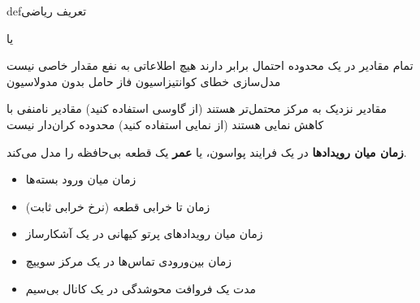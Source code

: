 \begin{PSbox}[unbreakable]{def}{تعریف ریاضی}

 یا 

\end{PSbox}










\lr{\mbox{\PSyes{}}} تمام مقادیر در یک محدوده احتمال برابر دارند\PSbr{}\lr{\mbox{\PSyes{}}} هیچ اطلاعاتی به نفع مقدار خاصی نیست\PSbr{}\lr{\mbox{\PSyes{}}} مدل‌سازی خطای کوانتیزاسیون\PSbr{}\lr{\mbox{\PSyes{}}} فاز حامل بدون مدولاسیون


\lr{\mbox{\PSno{}}} مقادیر نزدیک به مرکز محتمل‌تر هستند (از گاوسی استفاده کنید)\PSbr{}\lr{\mbox{\PSno{}}} مقادیر نامنفی با کاهش نمایی هستند (از نمایی استفاده کنید)\PSbr{}\lr{\mbox{\PSno{}}} محدوده کران‌دار نیست



\textbf{زمان میان رویدادها} در یک فرایند پواسون، یا \textbf{عمر} یک قطعه بی‌حافظه را مدل می‌کند.


\begin{itemize}
\tightlist
\item
  زمان میان ورود بسته‌ها
\item
  زمان تا خرابی قطعه (نرخ خرابی ثابت)
\item
  زمان میان رویدادهای پرتو کیهانی در یک آشکارساز
\item
  زمان بین‌ورودی تماس‌ها در یک مرکز سوییچ
\item
  مدت یک فروافت محوشدگی در یک کانال بی‌سیم
\end{itemize}

